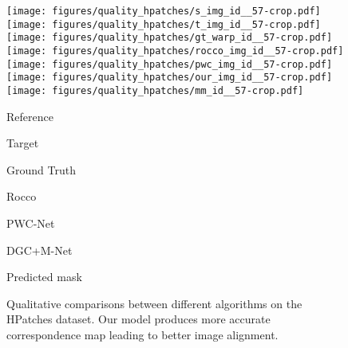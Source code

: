 \documentclass[10pt,twocolumn,letterpaper]{article}
\newcommand{\mpage}[2]
{
\begin{minipage}{#1\linewidth}\centering
#2
\end{minipage}
}
\begin{document}
\begin{figure*}[t!]
    \vspace{0.5mm}
    \texttt{[image: figures/quality\_hpatches/s\_img\_id\_\_57-crop.pdf]}
    \texttt{[image: figures/quality\_hpatches/t\_img\_id\_\_57-crop.pdf]}
    \texttt{[image: figures/quality\_hpatches/gt\_warp\_id\_\_57-crop.pdf]}
    \texttt{[image: figures/quality\_hpatches/rocco\_img\_id\_\_57-crop.pdf]}
    \texttt{[image: figures/quality\_hpatches/pwc\_img\_id\_\_57-crop.pdf]}
    \texttt{[image: figures/quality\_hpatches/our\_img\_id\_\_57-crop.pdf]}
    \texttt{[image: figures/quality\_hpatches/mm\_id\_\_57-crop.pdf]}
    \vspace{0.5mm}
\small{
\hfill
\mpage{0.100}{Reference} \hfill
\mpage{0.100}{Target} \hfill
\mpage{0.100}{Ground Truth} \hfill
\mpage{0.100}{Rocco~\etal~\cite{Rocco17}}\hfill
\mpage{0.100}{PWC-Net~\cite{PWC-Net}} \hfill
\mpage{0.100}{DGC+M-Net} \hfill
\mpage{0.100}{Predicted mask} \hfill
}
\vspace{0pt}\caption{Qualitative comparisons between different algorithms on the HPatches dataset. Our model produces more accurate correspondence map leading to better image alignment.}
	\label{fig:comparison_hpatches_qual}
\end{figure*}
\end{document}
